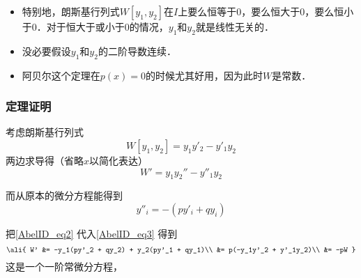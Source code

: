 \begin{itemize}
\item 特别地，朗斯基行列式$W[y_1, y_2]$在$I$上要么恒等于$0$，要么恒大于$0$，要么恒小于$0$．对于恒大于或小于$0$的情况，$y_1$和$y_2$就是线性无关的．
\item 没必要假设$y_1$和$y_2$的二阶导数连续．
\item 阿贝尔这个定理在$p(x)=0$的时候尤其好用，因为此时$W$是常数．
\end{itemize}


\subsubsection{定理证明}

考虑朗斯基行列式
\begin{equation}
W[y_1, y_2] = y_1y'_2 - y'_1y_2
\end{equation}
两边求导得（省略$x$以简化表达）
\begin{equation}\label{AbelID_eq3}
W' = y_1y_2'' - y''_1y_2
\end{equation}

而从原本的微分方程能得到
\begin{equation}\label{AbelID_eq2}
y''_i = -(py'_i+qy_i)
\end{equation}

把\autoref{AbelID_eq2} 代入\autoref{AbelID_eq3} 得到
\begin{equation}
\ali{
    W' &= -y_1(py'_2 + qy_2) + y_2(py'_1 + qy_1)\\
    &= p(-y_1y'_2 + y'_1y_2)\\
    &= -pW
}
\end{equation}
这是一个一阶常微分方程，












